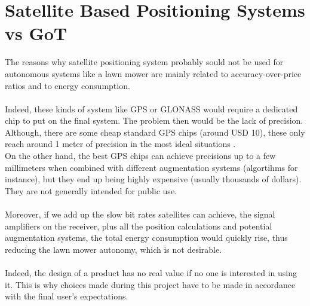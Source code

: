 \section{Satellite Based Positioning Systems vs GoT}
The reasons why satellite positioning system probably sould not be used for autonomous systems like a lawn mower are mainly related to accuracy-over-price ratios and to energy consumption.\\\\
%
Indeed, these kinds of system like GPS or GLONASS would require a dedicated chip to put on the final system. The problem then would be the lack of precision. Although, there are some cheap standard GPS chips (around USD 10), these only reach around 1 meter of precision in the most ideal situations \cite{GPSUSWebsiteAccuracy,Miller}. \\
On the other hand, the best GPS chips can achieve precisions up to a few millimeters \cite{GPSUSWebsiteAccuracy} when combined with different augmentation systems (algortihms for instance), but they end up being highly expensive (usually thousands of dollars). They are not generally intended for public use.\\\\
%
Moreover, if we add up the slow bit rates satellites can achieve, the signal amplifiers on the receiver, plus all the position calculations and potential augmentation systems, the total energy consumption would quickly rise, thus reducing the lawn mower autonomy, which is not desirable.\\\\
%
Indeed, the design of a product has no real value if no one is interested in using it. This is why choices made during this project have to be made in accordance with the final user's expectations.